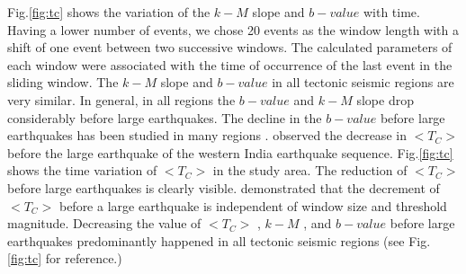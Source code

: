 \noindent
Fig.\ref{fig:tc} shows the variation of the  $k-M$  slope and  $b-value$  with time. Having a lower number of events, we chose 20 events as the window length with a shift of one event between two successive windows. The calculated parameters of each window were associated with the time of occurrence of the last event in the sliding window. The  $k-M$  slope and  $b-value$  in all tectonic seismic regions are very similar. In general, in all regions the $b-value$  and  $k-M$  slope drop considerably before large earthquakes. The decline in the  $b-value$  before large earthquakes has been studied in many regions \citep{Wyss2000, Wyss2006, Schorlemmer2005, Chan2012}.
\noindent
\citet{Telesca2016}  observed the decrease in  $<T_C>$  before the large earthquake of the western India earthquake sequence. Fig.\ref{fig:tc}  shows the time variation of  $<T_C>$   in the study area. The reduction of  $<T_C>$   before large earthquakes is clearly visible.  \citet{Telesca2016}  demonstrated that the decrement of  $<T_C>$   before a large earthquake is independent of window size and threshold magnitude. Decreasing the value of  $<T_C>$  ,  $k-M$ , and  $b-value$  before large earthquakes predominantly happened in all tectonic seismic regions (see Fig.\ref{fig:tc} for reference.)
 
